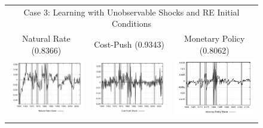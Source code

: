 \begin{figure}
\begin{tabular}{ccc}
\multicolumn{3}{c}{Case 3: Learning with Unobservable Shocks and RE Initial Conditions} \\ 
Natural Rate (0.8366) & Cost-Push (0.9343) & Monetary Policy (0.8062) \\
\includegraphics[scale=0.3]{results_reinit/natrateshock.png} & 
\includegraphics[scale=0.3]{results_reinit/costpushshock.png} & 
\includegraphics[scale=0.3]{results_reinit/mpshock.png} \\ \\ 
 

\end{tabular}
\end{figure}
